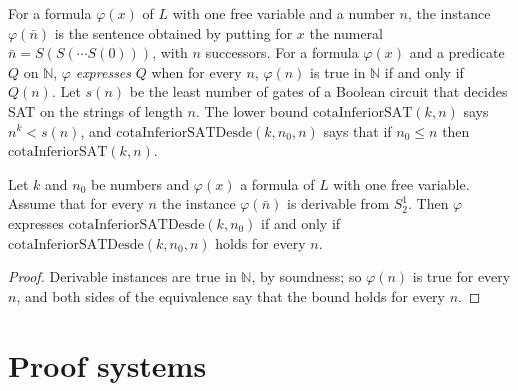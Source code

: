 \begin{definition}
  \label{def:arithmetic-expresa}
  \leanok
  \own{}
  \exploration{}
  For a formula $\varphi(x)$ of $L$ with one free variable and a number $n$, the instance
  $\varphi(\bar n)$ is the sentence obtained by putting for $x$ the numeral $\bar n = S(S(\cdots S(0)))$,
  with $n$ successors. For a formula $\varphi(x)$ and a predicate $Q$ on $\mathbb{N}$, $\varphi$
  \emph{expresses} $Q$ when for every $n$, $\varphi(n)$ is true in $\mathbb{N}$ if and only if $Q(n)$.
  Let $s(n)$ be the least number of gates of a Boolean circuit that decides SAT on the strings of
  length $n$. The lower bound $\mathrm{cotaInferiorSAT}(k, n)$ says $n^k < s(n)$, and
  $\mathrm{cotaInferiorSATDesde}(k, n_0, n)$ says that if $n_0 \le n$ then $\mathrm{cotaInferiorSAT}(k,
  n)$.
\end{definition}

\begin{theorem}
  \label{thm:arithmetic-expresa-verdad}
  \leanok
  Let $k$ and $n_0$ be numbers and $\varphi(x)$ a formula of $L$ with one free variable. Assume that
  for every $n$ the instance $\varphi(\bar n)$ is derivable from $S^1_2$. Then $\varphi$ expresses
  $\mathrm{cotaInferiorSATDesde}(k, n_0)$ if and only if $\mathrm{cotaInferiorSATDesde}(k, n_0, n)$
  holds for every $n$.
  \own{}
  \exploration{}
\end{theorem}

\begin{proof}
  \leanok
  Derivable instances are true in $\mathbb{N}$, by soundness; so $\varphi(n)$ is true for every $n$, and
  both sides of the equivalence say that the bound holds for every $n$.
\end{proof}

\section{Proof systems}
\label{sec:arithmetic-proof-systems}

